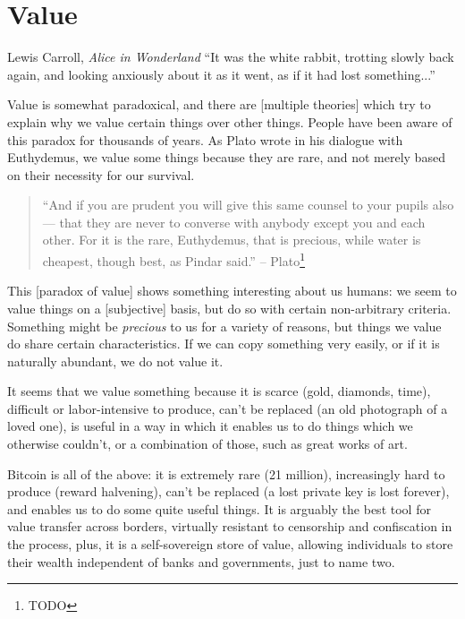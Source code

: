 \chapter{Value}
\label{les:10}

\begin{chapquote}{Lewis Carroll, \textit{Alice in Wonderland}}
``It was the white rabbit, trotting slowly back again, and looking anxiously
about it as it went, as if it had lost something...''
\end{chapquote}

Value is somewhat paradoxical, and there are [multiple theories] which
try to explain why we value certain things over other things. People
have been aware of this paradox for thousands of years. As Plato wrote
in his dialogue with Euthydemus, we value some things because they are
rare, and not merely based on their necessity for our survival.

\begin{quotation}
``And if you are prudent you will give this same counsel to your pupils
also --- that they are never to converse with anybody except you and
each other. For it is the rare, Euthydemus, that is precious, while
water is cheapest, though best, as Pindar said.''
\flushright -- Plato\footnote{TODO} %
\end{quotation}

This [paradox of value] shows something interesting about us humans: we
seem to value things on a [subjective] basis, but do so with certain
non-arbitrary criteria. Something might be \textit{precious} to us for a
variety of reasons, but things we value do share certain
characteristics. If we can copy something very easily, or if it is
naturally abundant, we do not value it.

It seems that we value something because it is scarce (gold, diamonds,
time), difficult or labor-intensive to produce, can't be replaced (an
old photograph of a loved one), is useful in a way in which it enables
us to do things which we otherwise couldn't, or a combination of those,
such as great works of art.

Bitcoin is all of the above: it is extremely rare (21 million),
increasingly hard to produce (reward halvening), can't be replaced (a
lost private key is lost forever), and enables us to do some quite
useful things. It is arguably the best tool for value transfer across
borders, virtually resistant to censorship and confiscation in the
process, plus, it is a self-sovereign store of value, allowing
individuals to store their wealth independent of banks and governments,
just to name two.

